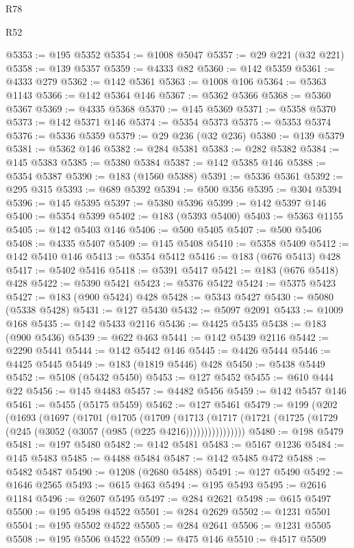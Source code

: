 \begin{lexlean}{R78}
\begin{lexlean}{R52}
\begin{coremodule}
{{{{{{{{{{{{{{{{{{{{{{{{{{{{{{{{{{{{{{{{{{{{{{{{{{{{{{{{{{{{{{{{{{{{{{{{{{{{{{{{{{{{{{{{{{{{{{{{{{{{{{{{{{{{{{{{{{{{{{{{{{{{{{{{{{{{{{{{{{{{{{{{{{{{{{{{{{{{{{{{{{{{{{{{{{{{{{{{{{{{{{{{{{{{{{{{{{{{{{@5353 := @195 @5352
@5354 := @1008 @5047
@5357 := @29 @221 (@32 @221)
@5358 := @139 @5357
@5359 := @4333 @82
@5360 := @142 @5359
@5361 := @4333 @279
@5362 := @142 @5361
@5363 := @1008 @106
@5364 := @5363 @1143
@5366 := @142 @5364 @146
@5367 := @5362 @5366
@5368 := @5360 @5367
@5369 := @4335 @5368
@5370 := @145 @5369
@5371 := @5358 @5370
@5373 := @142 @5371 @146
@5374 := @5354 @5373
@5375 := @5353 @5374
@5376 := @5336 @5359
@5379 := @29 @236 (@32 @236)
@5380 := @139 @5379
@5381 := @5362 @146
@5382 := @284 @5381
@5383 := @282 @5382
@5384 := @145 @5383
@5385 := @5380 @5384
@5387 := @142 @5385 @146
@5388 := @5354 @5387
@5390 := @183 (@1560 @5388)
@5391 := @5336 @5361
@5392 := @295 @315
@5393 := @689 @5392
@5394 := @500 @356
@5395 := @304 @5394
@5396 := @145 @5395
@5397 := @5380 @5396
@5399 := @142 @5397 @146
@5400 := @5354 @5399
@5402 := @183 (@5393 @5400)
@5403 := @5363 @1155
@5405 := @142 @5403 @146
@5406 := @500 @5405
@5407 := @500 @5406
@5408 := @4335 @5407
@5409 := @145 @5408
@5410 := @5358 @5409
@5412 := @142 @5410 @146
@5413 := @5354 @5412
@5416 := @183 (@676 @5413) @428
@5417 := @5402 @5416
@5418 := @5391 @5417
@5421 := @183 (@676 @5418) @428
@5422 := @5390 @5421
@5423 := @5376 @5422
@5424 := @5375 @5423
@5427 := @183 (@900 @5424) @428
@5428 := @5343 @5427
@5430 := @5080 (@5338 @5428)
@5431 := @127 @5430
@5432 := @5097 @2091
@5433 := @1009 @168
@5435 := @142 @5433 @2116
@5436 := @4425 @5435
@5438 := @183 (@900 @5436)
@5439 := @622 @463
@5441 := @142 @5439 @2116
@5442 := @2290 @5441
@5444 := @142 @5442 @146
@5445 := @4426 @5444
@5446 := @4425 @5445
@5449 := @183 (@1819 @5446) @428
@5450 := @5438 @5449
@5452 := @5108 (@5432 @5450)
@5453 := @127 @5452
@5455 := @610 @444 @22
@5456 := @145 @4483
@5457 := @4482 @5456
@5459 := @142 @5457 @146
@5461 := @5455 (@5175 @5459)
@5462 := @127 @5461
@5479 := @199
    (@202
      (@1693
        (@1697
          (@1701
            (@1705
              (@1709
                (@1713
                  (@1717 (@1721 (@1725 (@1729 (@245 (@3052 (@3057 (@985 (@225 @4216))))))))))))))))
@5480 := @198 @5479
@5481 := @197 @5480
@5482 := @142 @5481
@5483 := @5167 @1236
@5484 := @145 @5483
@5485 := @4488 @5484
@5487 := @142 @5485 @472
@5488 := @5482 @5487
@5490 := @1208 (@2680 @5488)
@5491 := @127 @5490
@5492 := @1646 @2565
@5493 := @615 @463
@5494 := @195 @5493
@5495 := @2616 @1184
@5496 := @2607 @5495
@5497 := @284 @2621
@5498 := @615 @5497
@5500 := @195 @5498 @4522
@5501 := @284 @2629
@5502 := @1231 @5501
@5504 := @195 @5502 @4522
@5505 := @284 @2641
@5506 := @1231 @5505
@5508 := @195 @5506 @4522
@5509 := @475 @146
@5510 := @4517 @5509
}}}}}}}}}}}}}}}}}}}}}}}}}}}}}}}}}}}}}}}}}}}}}}}}}}}}}}}}}}}}}}}}}}}}}}}}}}}}}}}}}}}}}}}}}}}}}}}}}}}}}}}}}}}}}}}}}}}}}}}}}}}}}}}}}}}}}}}}}}}}}}}}}}}}}}}}}}}}}}}}}}}}}}}}}}}}}}}}}}}}}}}}}}}}}}}}}}}}}}
\end{coremodule}
\end{lexlean}
\end{lexlean}
